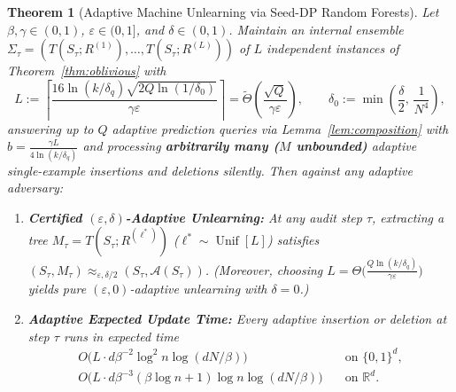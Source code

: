 \documentclass[11pt]{article}
\newtheorem{theorem}{Theorem}
\theoremstyle{definition}
\newcommand{\R}{\mathbb{R}}
\newcommand{\calA}{\mathcal{A}}
\newcommand{\Unif}{\operatorname{Unif}}
\begin{document}
\begin{theorem}[Adaptive Machine Unlearning via Seed-DP Random Forests]
\label{thm:adaptive}
Let $\beta, \gamma \in (0, 1)$, $\varepsilon \in (0, 1]$, and $\delta \in (0, 1)$. Maintain an internal ensemble $\Sigma_\tau = (T(S_\tau; R^{(1)}), \dots, T(S_\tau; R^{(L)}))$ of $L$ independent instances of Theorem~\ref{thm:oblivious} with
\[
    L := \left\lceil \frac{16 \ln(k / \delta_q) \sqrt{2 Q \ln(1/\delta_0)}}{\gamma \varepsilon} \right\rceil = \tilde{\Theta}\left(\frac{\sqrt{Q}}{\gamma \varepsilon}\right), \qquad \delta_0 := \min\left(\frac{\delta}{2}, \, \frac{1}{N^4}\right),
\]
answering up to $Q$ adaptive prediction queries via Lemma~\ref{lem:composition} with $b = \frac{\gamma L}{4 \ln(k/\delta_q)}$ and processing \textbf{arbitrarily many ($M$ unbounded)} adaptive single-example insertions and deletions silently. Then against any adaptive adversary:
\begin{enumerate}[leftmargin=1.5em,itemsep=2pt]
    \item \textbf{Certified $(\varepsilon, \delta)$-Adaptive Unlearning:} At any audit step $\tau$, extracting a tree $M_\tau = T(S_\tau; R^{(\ell^*)})$ ($\ell^* \sim \Unif[L]$) satisfies $(S_\tau, M_\tau) \approx_{\varepsilon, \delta/2} (S_\tau, \calA(S_\tau))$. (Moreover, choosing $L = \Theta\big(\frac{Q \ln(k/\delta_q)}{\gamma \varepsilon}\big)$ yields \emph{pure $(\varepsilon, 0)$-adaptive unlearning} with $\delta = 0$.)
    \item \textbf{Adaptive Expected Update Time:} Every adaptive insertion or deletion at step $\tau$ runs in expected time
    \begin{align*}
        O\Big(L \cdot d \beta^{-2} \log^2 n \log(dN/\beta)\Big) &\quad \text{on } \{0,1\}^d, \\
        O\Big(L \cdot d \beta^{-3} (\beta\log n + 1) \log n \log(dN/\beta)\Big) &\quad \text{on } \R^d.
    \end{align*}
\end{enumerate}
\end{theorem}
\end{document}
